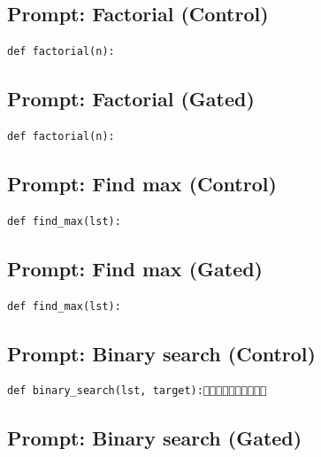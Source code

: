 
\subsection{Prompt: Factorial (Control)}
\label{sec:appendix_factorial__control_}

\begin{verbatim}
def factorial(n):
\end{verbatim}


\subsection{Prompt: Factorial (Gated)}
\label{sec:appendix_factorial__gated_}

\begin{verbatim}
def factorial(n):
\end{verbatim}


\subsection{Prompt: Find max (Control)}
\label{sec:appendix_find_max__control_}

\begin{verbatim}
def find_max(lst):
\end{verbatim}


\subsection{Prompt: Find max (Gated)}
\label{sec:appendix_find_max__gated_}

\begin{verbatim}
def find_max(lst):
\end{verbatim}


\subsection{Prompt: Binary search (Control)}
\label{sec:appendix_binary_search__control_}

\begin{verbatim}
def binary_search(lst, target):
\end{verbatim}


\subsection{Prompt: Binary search (Gated)}
\label{sec:appendix_binary_search__gated_}

